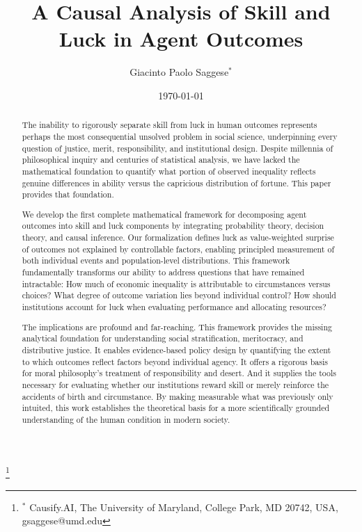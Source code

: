 \title{A Causal Analysis of Skill and Luck in Agent Outcomes}

\author{Giacinto Paolo Saggese$^{*}$}
\thanks{$^{*}$ Causify.AI, The University of Maryland, College Park, MD 20742,
USA, gsaggese@umd.edu}

\date{\today}

\maketitle

\begin{abstract}
  The inability to rigorously separate skill from luck in human outcomes
  represents perhaps the most consequential unsolved problem in social science,
  underpinning every question of justice, merit, responsibility, and institutional
  design. Despite millennia of philosophical inquiry and centuries of
  statistical analysis, we have lacked the mathematical foundation to quantify
  what portion of observed inequality reflects genuine differences in ability
  versus the capricious distribution of fortune. This paper provides
  that foundation.

  We develop the first complete mathematical framework for decomposing
  agent outcomes into skill and luck components by integrating
  probability theory, decision theory, and causal inference. Our formalization
  defines luck as value-weighted surprise of outcomes not explained by controllable
  factors, enabling principled measurement of both individual events and
  population-level distributions. This framework fundamentally transforms
  our ability to address questions that have remained intractable: How
  much of economic inequality is attributable to circumstances versus
  choices? What degree of outcome variation lies beyond individual control?
  How should institutions account for luck when evaluating performance
  and allocating resources?

  The implications are profound and far-reaching. This framework provides
  the missing analytical foundation for understanding social stratification,
  meritocracy, and distributive justice. It enables evidence-based
  policy design by quantifying the extent to which outcomes reflect
  factors beyond individual agency. It offers a rigorous basis for moral
  philosophy's treatment of responsibility and desert. And it supplies
  the tools necessary for evaluating whether our institutions reward
  skill or merely reinforce the accidents of birth and circumstance. By making
  measurable what was previously only intuited, this work establishes
  the theoretical basis for a more scientifically grounded understanding
  of the human condition in modern society.
\end{abstract}

